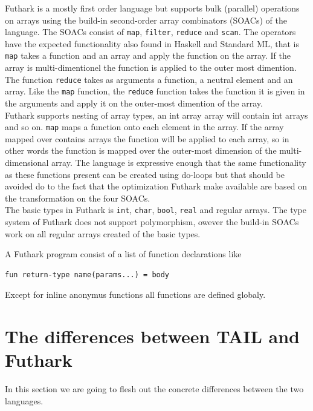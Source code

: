 \documentclass[11pt]{article}
\begin{document}
Futhark is a mostly first order language but supports bulk (parallel) operations on arrays
using the build-in second-order array combinators (SOACs) of the language. 
The SOACs consist of {\tt map}, {\tt filter}, {\tt reduce} and {\tt scan}.
The operators have the expected functionality also found in Haskell and Standard ML, that is {\tt map} takes a function and an array and apply the function on the array. If the array is multi-dimentionel the function is applied to the outer most dimention. The function {\tt reduce} takes as arguments a function, a neutral element and an array. Like the {\tt map} function, the {\tt reduce} function takes the function it is given in the arguments and apply it on the outer-most dimention of the array. \\ 

Futhark supports nesting of array types, an int array array will contain int arrays and so on.
{\tt map} maps a function onto each element in the array.
If the array mapped over contains arrays the function will be applied to each array,
so in other words the function is mapped over the outer-most dimension of the multi-dimensional array.
The language is expressive enough that the same functionality as these functions present can be created using do-loops
but that should be avoided do to the fact that the optimization Futhark make available are based on the
transformation on the four SOACs. \\

The basic types in Futhark is {\tt int}, {\tt char}, {\tt bool}, {\tt real} and regular arrays.
The type system of Futhark does not support polymorphism,
owever the build-in SOACs work on all regular arrays created of the basic types. 


A Futhark program consist of a list of function declarations like
\begin{lstlisting}[numbers=none,frame=none]
fun return-type name(params...) = body
\end{lstlisting}

Except for inline anonymus functions all functions are defined globaly. 

\section{The differences between TAIL and Futhark}
In this section we are going to flesh out the concrete differences between the two languages. 
\end{document}
